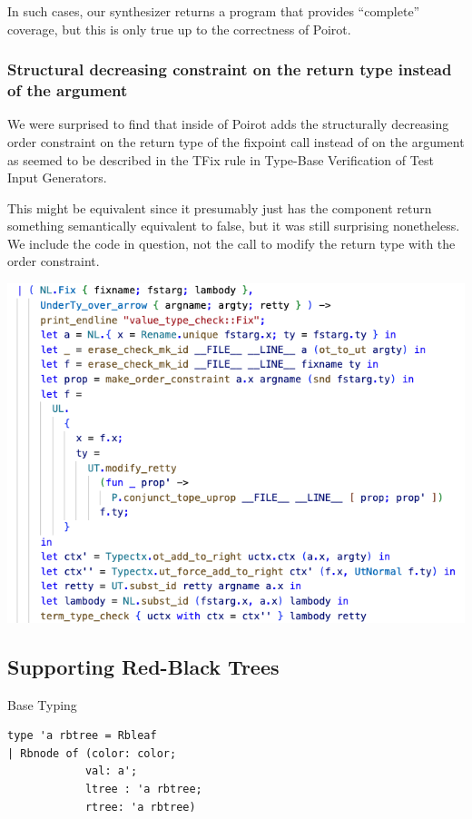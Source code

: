 \documentclass[review, sigplan]{acmart}
\begin{document}
In such cases, our synthesizer returns a program that provides ``complete''
coverage, but this is only true up to the correctness of Poirot.

\subsubsection{Structural decreasing constraint on the return type instead of the argument}
We were surprised to find that inside of Poirot adds the structurally decreasing
order constraint on the return type of the fixpoint call instead of on the
argument as seemed to be described in the TFix rule in Type-Base Verification of
Test Input Generators.

This might be equivalent since it presumably just has the component return
something semantically equivalent to false, but it was still surprising nonetheless. We include the code in question, not the call to modify the return type
with the order constraint.

\includegraphics[scale=.35]{fix.png}


\subsection{Supporting Red-Black Trees}
Base Typing
\begin{lstlisting}[language=caml, basicstyle=\small\ttfamily]
type 'a rbtree = Rbleaf
| Rbnode of (color: color;
            val: a';
            ltree : 'a rbtree;
            rtree: 'a rbtree)
\end{lstlisting}
\end{document}
